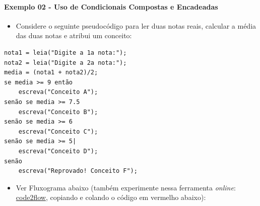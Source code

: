 \documentclass[12pt,a4paper]{article}
\providecommand{\tightlist}{%
      \setlength{\itemsep}{0pt}\setlength{\parskip}{0pt}}
\begin{document}
    \hypertarget{exemplo-02---uso-de-condicionais-compostas-e-encadeadas}{%
\paragraph{Exemplo 02 - Uso de Condicionais Compostas e
Encadeadas}\label{exemplo-02---uso-de-condicionais-compostas-e-encadeadas}}

    \begin{itemize}
\tightlist
\item
  Considere o seguinte pseudocódigo para ler duas notas reais, calcular
  a média das duas notas e atribui um conceito:
\end{itemize}

    \begin{verbatim}
nota1 = leia("Digite a 1a nota:");
nota2 = leia("Digite a 2a nota:");
media = (nota1 + nota2)/2;
se media >= 9 então  
    escreva("Conceito A"); 
senão se media >= 7.5  
    escreva("Conceito B"); 
senão se media >= 6 
    escreva("Conceito C"); 
senão se media >= 5| 
    escreva("Conceito D"); 
senão 
    escreva("Reprovado! Conceito F"); 
\end{verbatim}

    \begin{itemize}
\tightlist
\item
  Ver Fluxograma abaixo (também experimente nessa ferramenta
  \emph{online}: \href{https://app.code2flow.com/}{code2flow}, copiando
  e colando o código em vermelho abaixo):
\end{itemize}
\end{document}
